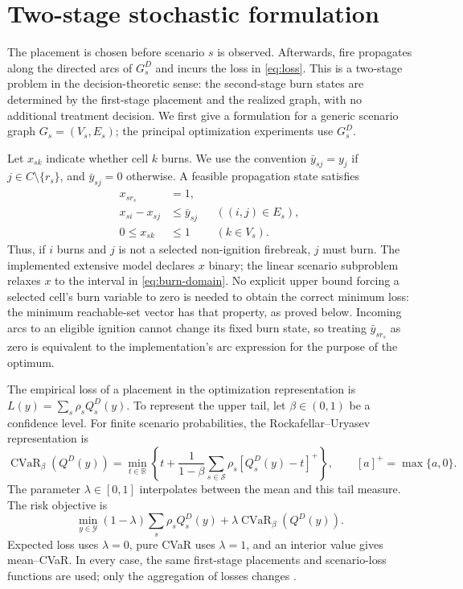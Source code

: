 \section{Two-stage stochastic formulation}\label{sec:model}

The placement is chosen before scenario $s$ is observed. Afterwards, fire
propagates along the directed arcs of $G_s^D$ and incurs the loss in
\eqref{eq:loss}. This is a two-stage problem in the decision-theoretic
sense: the second-stage burn states are determined by the first-stage
placement and the realized graph, with no additional treatment decision.
We first give a formulation for a generic scenario graph
$G_s=(V_s,E_s)$; the principal optimization experiments use $G_s^D$.

Let $x_{sk}$ indicate whether cell $k$ burns. We use the convention
$\bar y_{sj}=y_j$ if $j\in C\setminus\{r_s\}$, and
$\bar y_{sj}=0$ otherwise. A feasible propagation state satisfies
\begin{subequations}\label{eq:propagation}
\begin{align}
 x_{sr_s}&=1,\label{eq:ignite}\\
 x_{si}-x_{sj}&\le\bar y_{sj}
       &&((i,j)\in E_s),\label{eq:arcs}\\
 0\le x_{sk}&\le1 &&(k\in V_s).\label{eq:burn-domain}
\end{align}
\end{subequations}
Thus, if $i$ burns and $j$ is not a selected non-ignition firebreak,
$j$ must burn. The implemented extensive model declares $x$ binary;
the linear scenario subproblem relaxes $x$ to the interval in
\eqref{eq:burn-domain}. No explicit upper bound forcing a selected
cell's burn variable to zero is needed to obtain the correct minimum loss:
the minimum reachable-set vector has that property, as proved below.
Incoming arcs to an eligible ignition cannot change its fixed burn state,
so treating $\bar y_{sr_s}$ as zero is equivalent to the implementation's
arc expression for the purpose of the optimum.

The empirical loss of a placement in the optimization representation is
$L(y)=\sum_s\rho_s Q_s^D(y)$. To represent the upper tail, let
$\beta\in(0,1)$ be a confidence level. For finite scenario probabilities,
the Rockafellar--Uryasev representation is
\begin{equation}\label{eq:cvar}
 \operatorname{CVaR}_{\beta}(Q^D(y))
 =\min_{t\in\mathbb R}
 \left\{t+\frac{1}{1-\beta}
       \sum_{s\in\mathcal S}\rho_s[Q_s^D(y)-t]^+\right\},
 \qquad [a]^+=\max\{a,0\}.
\end{equation}
The parameter $\lambda\in[0,1]$ interpolates between the mean and this
tail measure. The risk objective is
\begin{equation}\label{eq:risk}
 \min_{y\in\mathcal Y}
  (1-\lambda)\sum_s\rho_s Q_s^D(y)
       +\lambda\operatorname{CVaR}_{\beta}(Q^D(y)).
\end{equation}
Expected loss uses $\lambda=0$, pure CVaR uses $\lambda=1$, and an
interior value gives mean--CVaR. In every case, the same first-stage
placements and scenario-loss functions are used; only the aggregation of
losses changes \citep{rockafellar2000optimization}.

